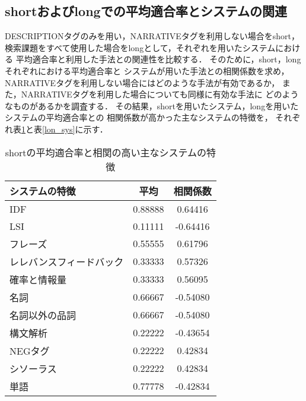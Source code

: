 \clearpage
\subsection{shortおよびlongでの平均適合率とシステムの関連} \label{slheikin}
DESCRIPTIONタグのみを用い，NARRATIVEタグを利用しない場合をshort，
検索課題をすべて使用した場合をlongとして，それぞれを用いたシステムにおける
平均適合率と利用した手法との関連性を比較する．
そのために，short，longそれぞれにおける平均適合率と
システムが用いた手法との相関係数を求め，
NARRATIVEタグを利用しない場合にはどのような手法が有効であるか，
また，NARRATIVEタグを利用した場合についても同様に有効な手法に
どのようなものがあるかを調査する．
その結果，shortを用いたシステム，longを用いたシステムの平均適合率との
相関係数が高かった主なシステムの特徴を，
それぞれ表\ref{sho_sys}と表\ref{lon_sys}に示す．

\begin{table}[t]
\renewcommand{\arraystretch}{}
\caption{shortの平均適合率と相関の高い主なシステムの特徴}
\centering
\small
\label{sho_sys}
\begin{tabular}{lcc} 
システムの特徴 		&   平均  & 相関係数 \\ \hline
IDF    			& 0.88888 &  0.64416 \\
LSI 			& 0.11111 & -0.64416 \\
フレーズ 		& 0.55555 &  0.61796 \\
レレバンスフィードバック& 0.33333 &  0.57326 \\
確率と情報量		& 0.33333 &  0.56095 \\
名詞	 		& 0.66667 & -0.54080 \\
名詞以外の品詞 		& 0.66667 & -0.54080 \\
構文解析 		& 0.22222 & -0.43654 \\
NEGタグ		 	& 0.22222 &  0.42834 \\
シソーラス		& 0.22222 &  0.42834 \\
単語		 	& 0.77778 & -0.42834 \\ \hline
\end{tabular}
\end{table}

